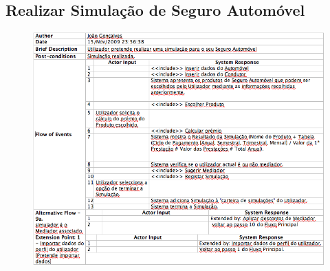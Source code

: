 \pagebreak

\subsection{Realizar Simulação de Seguro Automóvel}
\begin{figure}[!htb]
	\centering
	\includegraphics[scale=0.6]{images/Prints/RealizacaoSeguroAutomovel/RealizacaoSeguroAutomovel.png}
\end{figure}

\pagebreak

